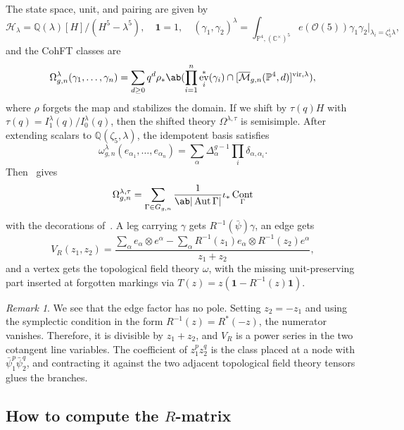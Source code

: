 \documentclass{amsart}
\theoremstyle{definition}
\theoremstyle{remark}
\newtheorem{rmk}[thm]{Remark}
\theoremstyle{plain}
\theoremstyle{definition}
\theoremstyle{remark}
\newcommand{\C}{\mathbb{C}}
\newcommand{\Q}{\mathbb{Q}}
\renewcommand{\P}{\mathbb{P}}
\newcommand{\Mbar}{\overline{\mathcal{M}}}
\newcommand{\mc}[1]{\mathcal{#1}}
\newcommand{\mr}[1]{\mathrm{#1}}
\newcommand{\1}{\mathbf{1}}
\newcommand{\2}{\mathbf{2}}
\newcommand{\3}{\mathbf{3}}
\newcommand{\vir}{\mr{vir}}
\DeclareMathOperator{\Aut}{Aut}
\DeclareMathOperator{\ev}{ev}
\DeclareMathOperator{\Cont}{Cont}
\begin{document}
The state space, unit, and pairing are given by
\[ \mc{H}_{\lambda} = \Q(\lambda)[H]/(H^5-\lambda^5), \quad \1 = 1, \quad (\gamma_1,\gamma_2)^{\lambda} = \int_{\P^4, (\C^{\times})^5} e(\mc{O}(5))\gamma_1\gamma_2 \Big|_{\lambda_i = \zeta_5^i\lambda}, \]
and the CohFT classes are
\[ \Omega^{\lambda}_{g,n}(\gamma_1, \ldots, \gamma_n) = \sum_{d \geq 0} q^d \rho_* \ab( \prod_{i=1}^n \ev_i^*(\gamma_i) \cap [\Mbar_{g,n}(\P^4,d)]^{\vir,\lambda}), \]
where \(\rho\) forgets the map and stabilizes the domain. If we shift by \(\tau(q)H\) with \(\tau(q) = I^{\lambda}_1(q)/I^{\lambda}_0(q)\), then the shifted theory \(\Omega^{\lambda,\tau}\) is semisimple. After extending scalars to \(\Q(\zeta_5,\lambda)\), the idempotent basis satisfies
\[ \omega^{\lambda}_{g,n}(e_{\alpha_1}, \ldots, e_{\alpha_n}) = \sum_{\alpha}\Delta_{\alpha}^{g-1}\prod_i \delta_{\alpha,\alpha_i}. \]
Then~ gives
\[ \Omega^{\lambda,\tau}_{g,n} = \sum_{\Gamma \in G_{g,n}} \frac{1}{\ab|\Aut\Gamma|}\iota_* \Cont_{\Gamma} \]
with the decorations of~. A leg carrying \(\gamma\) gets \(R^{-1}(\bar{\psi})\gamma\), an edge gets
\[ V_R(z_1,z_2) = \frac{\sum_{\alpha} e_{\alpha}\otimes e^{\alpha} - \sum_{\alpha} R^{-1}(z_1)e_{\alpha} \otimes R^{-1}(z_2)e^{\alpha}}{z_1+z_2}, \]
and a vertex gets the topological field theory \(\omega\), with the missing unit-preserving part inserted at forgotten markings via \(T(z) = z(\1 - R^{-1}(z)\1)\).

\begin{rmk}
    We see that the edge factor has no pole. Setting \(z_2 = -z_1\) and using the symplectic condition in the form \(R^{-1}(z) = R^*(-z)\), the numerator vanishes. Therefore, it is divisible by \(z_1+z_2\), and \(V_R\) is a power series in the two cotangent line variables. The coefficient of \(z_1^p z_2^q\) is the class placed at a node with \(\bar{\psi}_1^p \bar{\psi}_2^q\), and contracting it against the two adjacent topological field theory tensors glues the branches.
\end{rmk}

\subsection{How to compute the \(R\)-matrix}%
\label{sub:How to compute the R-matrix (Guo)}
\end{document}
